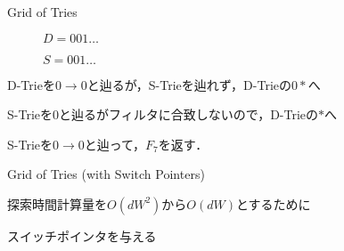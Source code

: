 \documentclass[a4paper,10pt]{jarticle}
\begin{document}
\begin{frame}{Grid of Tries}

\begin{figure}[h]
 \def\@captype{table}
 \begin{minipage}[c]{.55\textwidth}
   \scalebox{0.55}{}
  \end{minipage}
  \hfill
  \begin{minipage}[c]{.2\textwidth}
  $D = 001 \dots$
  \par
  $S = 001 \dots$
  \end{minipage}
\end{figure}

\vspace{3mm}
D-Trieを$0 \to 0$と辿るが，S-Trieを辿れず，D-Trieの$0*$へ
\par
\vspace{2mm}
S-Trieを$0$と辿るがフィルタに合致しないので，D-Trieの$*$へ
\par
\vspace{2mm}
S-Trieを$0 \to 0$と辿って，$F_{7}$を返す．
\end{frame}

\begin{frame}{Grid of Tries (with Switch Pointers)}

 \begin{figure}
  {\centering
  \scalebox{0.6}{}

  }
 \end{figure}

\vspace{5mm}

探索時間計算量を$O(dW^{2})$から$O(dW)$とするために
\par
\vspace{3mm}
スイッチポインタを与える

\end{frame}
\end{document}
